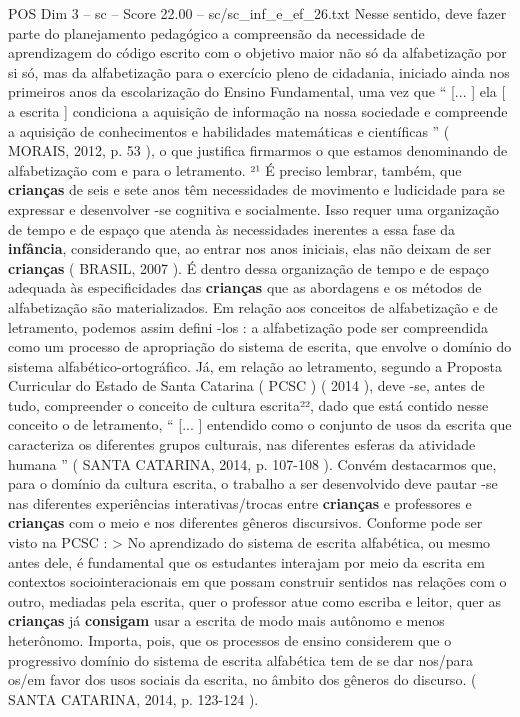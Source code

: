 \begin{textsample}{POS Dim 3 – sc – Score 22.00 – sc/sc\_inf\_e\_ef\_26.txt}
Nesse sentido, deve fazer parte do planejamento pedagógico a compreensão da necessidade de aprendizagem do código escrito com o objetivo maior não só da alfabetização por si só, mas da alfabetização para o exercício pleno de cidadania, iniciado ainda nos primeiros anos da escolarização do Ensino Fundamental, uma vez que “ [... ] ela [ a escrita ] condiciona a aquisição de informação na nossa sociedade e compreende a aquisição de conhecimentos e habilidades matemáticas e científicas ” ( MORAIS, 2012, p. 53 ), o que justifica firmarmos o que estamos denominando de alfabetização com e para o letramento. ²¹ É preciso lembrar, também, que \textbf{crianças} de seis e sete anos têm necessidades de movimento e ludicidade para se expressar e desenvolver -se cognitiva e socialmente.
Isso requer uma organização de tempo e de espaço que atenda às necessidades inerentes a essa fase da \textbf{infância}, considerando que, ao entrar nos anos iniciais, elas não deixam de ser \textbf{crianças} ( BRASIL, 2007 ).
É dentro dessa organização de tempo e de espaço adequada às especificidades das \textbf{crianças} que as abordagens e os métodos de alfabetização são materializados.
Em relação aos conceitos de alfabetização e de letramento, podemos assim defini -los : a alfabetização pode ser compreendida como um processo de apropriação do sistema de escrita, que envolve o domínio do sistema alfabético-ortográfico.
Já, em relação ao letramento, segundo a Proposta Curricular do Estado de Santa Catarina ( PCSC ) ( 2014 ), deve -se, antes de tudo, compreender o conceito de cultura escrita²², dado que está contido nesse conceito o de letramento, “ [... ] entendido como o conjunto de usos da escrita que caracteriza os diferentes grupos culturais, nas diferentes esferas da atividade humana ” ( SANTA CATARINA, 2014, p. 107-108 ).
Convém destacarmos que, para o domínio da cultura escrita, o trabalho a ser desenvolvido deve pautar -se nas diferentes experiências interativas/trocas entre \textbf{crianças} e professores e \textbf{crianças} com o meio e nos diferentes gêneros discursivos.
Conforme pode ser visto na PCSC : > No aprendizado do sistema de escrita alfabética, ou mesmo antes dele, é fundamental que os estudantes interajam por meio da escrita em contextos sociointeracionais em que possam construir sentidos nas relações com o outro, mediadas pela escrita, quer o professor atue como escriba e leitor, quer as \textbf{crianças} já \textbf{consigam} usar a escrita de modo mais autônomo e menos heterônomo.
Importa, pois, que os processos de ensino considerem que o progressivo domínio do sistema de escrita alfabética tem de se dar nos/para os/em favor dos usos sociais da escrita, no âmbito dos gêneros do discurso. ( SANTA CATARINA, 2014, p. 123-124 ).

\end{textsample}
